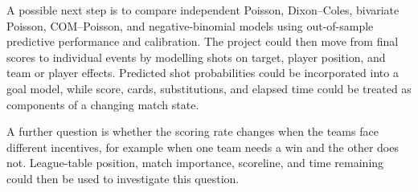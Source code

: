 \documentclass[11pt,a4paper]{amsart}
\numberwithin{equation}{section}
\begin{document}
A possible next step is to compare independent Poisson, Dixon--Coles, bivariate Poisson, COM--Poisson, and negative-binomial models using out-of-sample predictive performance and calibration. The project could then move from final scores to individual events by modelling shots on target, player position, and team or player effects. Predicted shot probabilities could be incorporated into a goal model, while score, cards, substitutions, and elapsed time could be treated as components of a changing match state.

A further question is whether the scoring rate changes when the teams face different incentives, for example when one team needs a win and the other does not. League-table position, match importance, scoreline, and time remaining could then be used to investigate this question.


\newpage
\end{document}
